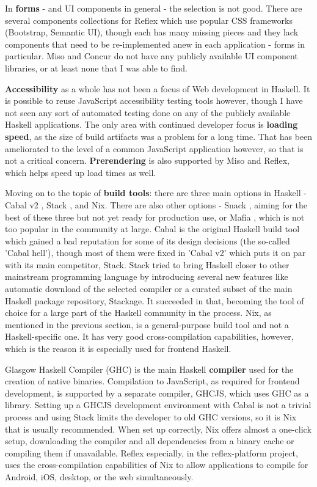 \documentclass[english,odsaz]{fitthesis}
\begin{document}
In \textbf{forms} - and UI components in general - the selection is not good. There
are several components collections for Reflex which use popular CSS frameworks
(Bootstrap, Semantic UI), though each has many missing pieces and they lack
components that need to be re-implemented anew in each application - forms in
particular. Miso and Concur do not have any publicly available UI component
libraries, or at least none that I was able to find.

\textbf{Accessibility} as a whole has not been a focus of Web development in Haskell. It
is possible to reuse JavaScript accessibility testing tools however, though I
have not seen any sort of automated testing done on any of the publicly
available Haskell applications. The only area with continued developer focus is
\textbf{loading speed}, as the size of build artifacts was a problem for a long
time. That has been ameliorated to the level of a common JavaScript application
however, so that is not a critical concern. \textbf{Prerendering} is also supported by
Miso and Reflex, which helps speed up load times as well.

Moving on to the topic of \textbf{build tools}: there are three main options in Haskell -
Cabal v2 \cite{cabal}, Stack \cite{stack}, and Nix. There are also other options -
Snack \cite{snack}, aiming for the best of these three but not yet ready for
production use, or Mafia \cite{mafia}, which is not too popular in the community
at large. Cabal is the original Haskell build tool which gained a bad reputation
for some of its design decisions (the so-called 'Cabal hell'), though most of
them were fixed in 'Cabal v2' which puts it on par with its main competitor,
Stack. Stack tried to bring Haskell closer to other mainstream programming
language by introducing several new features like automatic download of the
selected compiler or a curated subset of the main Haskell package repository,
Stackage. It succeeded in that, becoming the tool of choice for a large part of
the Haskell community in the process. Nix, as mentioned in the previous section,
is a general-purpose build tool and not a Haskell-specific one. It has very good
cross-compilation capabilities, however, which is the reason it is especially
used for frontend Haskell.

Glasgow Haskell Compiler (GHC) is the main Haskell \textbf{compiler} used for the
creation of native binaries. Compilation to JavaScript, as required for frontend
development, is supported by a separate compiler, GHCJS, which uses GHC as a
library. Setting up a GHCJS development environment with Cabal is not a trivial
process and using Stack limits the developer to old GHC versions, so it is Nix
that is usually recommended. When set up correctly, Nix offers almost a
one-click setup, downloading the compiler and all dependencies from a binary
cache or compiling them if unavailable. Reflex especially, in the
reflex-platform \cite{reflex-platform} project, uses the cross-compilation
capabilities of Nix to allow applications to compile for Android, iOS, desktop,
or the web simultaneously.
\end{document}
